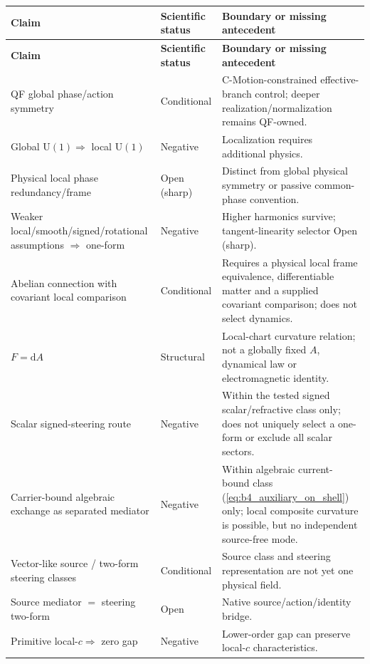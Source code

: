 \documentclass[11pt]{article}
\theoremstyle{definition}
\newcommand{\dd}{\mathrm{d}}
\newcommand{\Uone}{\mathrm{U}(1)}
\begin{document}
\renewcommand{\arraystretch}{1.15}
\footnotesize
\begin{longtable}{>{\raggedright\arraybackslash}p{}
                  >{\raggedright\arraybackslash}p{}
                  >{\raggedright\arraybackslash}p{}}
\toprule
\textbf{Claim} & \textbf{Scientific status} & \textbf{Boundary or missing antecedent}\\
\midrule
\endfirsthead
\toprule
\textbf{Claim} & \textbf{Scientific status} & \textbf{Boundary or missing antecedent}\\
\midrule
\endhead
QF global phase/action symmetry & Conditional & C-Motion-constrained effective-branch control; deeper realization/normalization remains QF-owned.\\
Global $\Uone\Rightarrow$ local $\Uone$ & Negative & Localization requires additional physics.\\
Physical local phase redundancy/frame & Open (sharp) & Distinct from global physical symmetry or passive common-phase convention.\\
Weaker local/smooth/signed/rotational assumptions $\Rightarrow$ one-form & Negative & Higher harmonics survive; tangent-linearity selector Open (sharp).\\
Abelian connection with covariant local comparison & Conditional & Requires a physical local frame equivalence, differentiable matter and a supplied covariant comparison; does not select dynamics.\\
$F=\dd A$ & Structural & Local-chart curvature relation; not a globally fixed $A$, dynamical law or electromagnetic identity.\\
Scalar signed-steering route & Negative & Within the tested signed scalar/refractive class only; does not uniquely select a one-form or exclude all scalar sectors.\\
Carrier-bound algebraic exchange as separated mediator & Negative & Within algebraic current-bound class (\cref{eq:b4_auxiliary_on_shell}) only; local composite curvature is possible, but no independent source-free mode.\\
Vector-like source / two-form steering classes & Conditional & Source class and steering representation are not yet one physical field.\\
Source mediator $=$ steering two-form & Open & Native source/action/identity bridge.\\
Primitive local-$c\Rightarrow$ zero gap & Negative & Lower-order gap can preserve local-$c$ characteristics.\\

\end{longtable}
\end{document}
